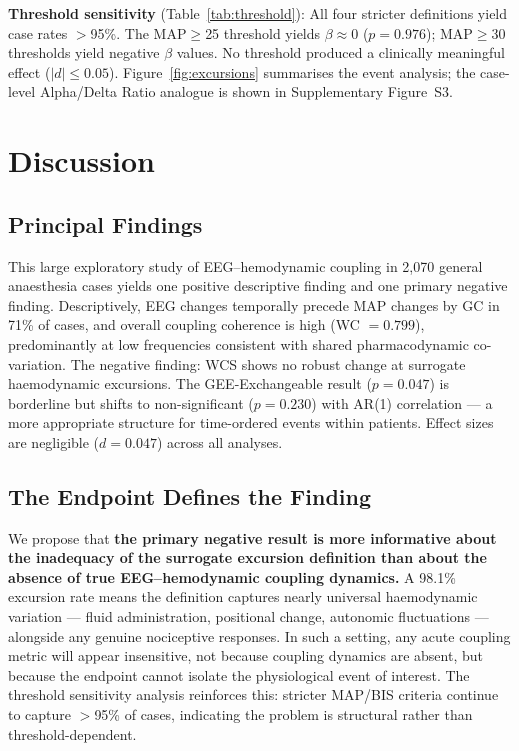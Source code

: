 \documentclass[fleqn,10pt,lineno]{wlpeerj}
\begin{document}
\textbf{Threshold sensitivity} (Table~\ref{tab:threshold}): All four stricter definitions
yield case rates $>$95\%. The MAP$\geq$25 threshold yields $\beta \approx 0$ ($p = 0.976$);
MAP$\geq$30 thresholds yield negative $\beta$ values. No threshold produced a clinically
meaningful effect ($|d| \leq 0.05$). Figure~\ref{fig:excursions} summarises the event analysis;
the case-level Alpha/Delta Ratio analogue is shown in Supplementary Figure~S3.

\section{Discussion}

\subsection{Principal Findings}

This large exploratory study of EEG--hemodynamic coupling in 2,070 general anaesthesia cases
yields one positive descriptive finding and one primary negative finding. Descriptively, EEG
changes temporally precede MAP changes by GC in 71\% of cases, and overall coupling coherence
is high (WC $= 0.799$), predominantly at low frequencies consistent with shared pharmacodynamic
co-variation. The negative finding: WCS shows no robust change at surrogate haemodynamic
excursions. The GEE-Exchangeable result ($p = 0.047$) is borderline but shifts to
non-significant ($p = 0.230$) with AR(1) correlation --- a more appropriate structure for
time-ordered events within patients. Effect sizes are negligible ($d = 0.047$) across all
analyses.

\subsection{The Endpoint Defines the Finding}

We propose that \textbf{the primary negative result is more informative about the inadequacy of
the surrogate excursion definition than about the absence of true EEG--hemodynamic coupling
dynamics.} A 98.1\% excursion rate means the definition captures nearly universal haemodynamic
variation --- fluid administration, positional change, autonomic fluctuations --- alongside any
genuine nociceptive responses. In such a setting, any acute coupling metric will appear
insensitive, not because coupling dynamics are absent, but because the endpoint cannot isolate
the physiological event of interest. The threshold sensitivity analysis reinforces this:
stricter MAP/BIS criteria continue to capture $>$95\% of cases, indicating the problem is
structural rather than threshold-dependent.
\end{document}
